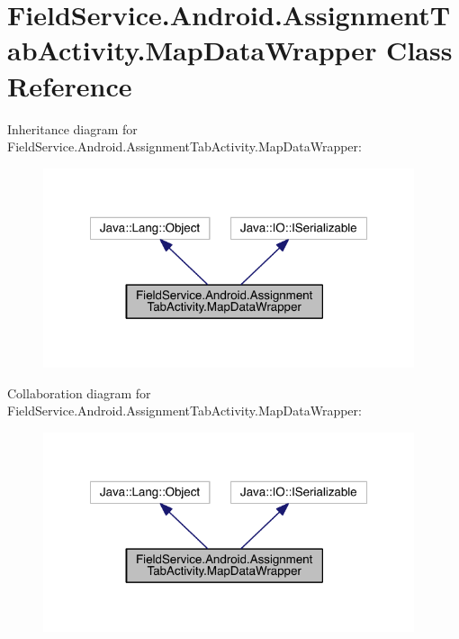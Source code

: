 \hypertarget{class_field_service_1_1_android_1_1_assignment_tab_activity_1_1_map_data_wrapper}{\section{Field\+Service.\+Android.\+Assignment\+Tab\+Activity.\+Map\+Data\+Wrapper Class Reference}
\label{class_field_service_1_1_android_1_1_assignment_tab_activity_1_1_map_data_wrapper}
}


Inheritance diagram for Field\+Service.\+Android.\+Assignment\+Tab\+Activity.\+Map\+Data\+Wrapper\+:
\nopagebreak
\begin{figure}[H]
\begin{center}
\leavevmode
\includegraphics[width=309pt]{class_field_service_1_1_android_1_1_assignment_tab_activity_1_1_map_data_wrapper__inherit__graph}
\end{center}
\end{figure}


Collaboration diagram for Field\+Service.\+Android.\+Assignment\+Tab\+Activity.\+Map\+Data\+Wrapper\+:
\nopagebreak
\begin{figure}[H]
\begin{center}
\leavevmode
\includegraphics[width=309pt]{class_field_service_1_1_android_1_1_assignment_tab_activity_1_1_map_data_wrapper__coll__graph}
\end{center}
\end{figure}

